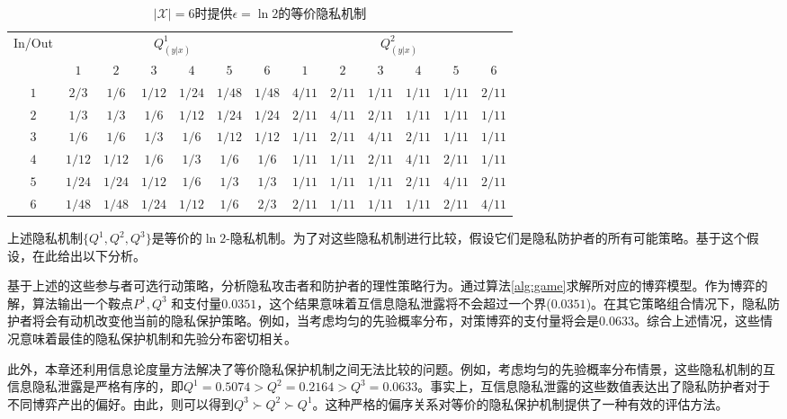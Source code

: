 \begin{table}[htbp]
\small
	\centering
	\caption{$|\mathcal{X}|=6$时提供$\epsilon=\ln2$的等价隐私机制}
	\label{tab:chapter07_6}
	\begin{tabular}{ccccccccccccc}
		\toprule
		\multirow{2}{*}{In/Out} & \multicolumn{6}{c}{$Q^1_{(y|x)}$} & \multicolumn{6}{c}{$Q^2_{(y|x)}$} \\
		\cmidrule(r){2-7} \cmidrule(r){8-13}
		&  $1$      &  $2$   &   $3$ &  $4$      &  $5$   &   $6$
		&  $1$      &  $2$   &   $3$ &  $4$      &  $5$   &   $6$\\
		\midrule
		$1$  &$2/3$  & $1/6$ &$1/12$   & $1/24$  & $1/48$   & $1/48$             &$4/11$  & $2/11$ &$1/11$ & $1/11$ &$1/11$  & $2/11$ \\
		$2$  &$1/3$   &$1/3$  & $1/6$ & $1/12$  & $1/24$  & $1/24$               &$2/11$  & $4/11$ &$2/11$ & $1/11$ &$1/11$  & $1/11$ \\
		$3$ &$1/6$ & $1/6$  & $1/3$  & $1/6$  & $1/12$ & $1/12$                  &$1/11$  & $2/11$ &$4/11$ & $2/11$ &$1/11$  & $1/11$ \\
		$4$ &$1/12$ & $1/12$  & $1/6$  & $1/3$  & $1/6$ & $1/6$                  &$1/11$  & $1/11$ &$2/11$ & $4/11$ &$2/11$  & $1/11$ \\
		$5$  &$1/24$ & $1/24$  & $1/12$  & $1/6$  & $1/3$ & $1/3$                &$1/11$  & $1/11$ &$1/11$ & $2/11$ &$4/11$  & $2/11$ \\
		$6$ &$1/48$ & $1/48$  & $1/24$  & $1/12$  & $1/6$ & $2/3$                &$2/11$  & $1/11$ &$1/11$ & $1/11$ &$2/11$  & $4/11$ \\
		\bottomrule
	\end{tabular}
\end{table}

上述隐私机制$\{Q^1,Q^2,Q^3\}$是等价的$\ln 2$-隐私机制。为了对这些隐私机制进行比较，假设它们是隐私防护者的所有可能策略。基于这个假设，在此给出以下分析。

基于上述的这些参与者可选行动策略，分析隐私攻击者和防护者的理性策略行为。通过算法\ref{alg:game}求解所对应的博弈模型。作为博弈的解，算法输出一个鞍点$P^1,Q^3$ 和支付量$0.0351$，这个结果意味着互信息隐私泄露将不会超过一个界($0.0351$)。在其它策略组合情况下，隐私防护者将会有动机改变他当前的隐私保护策略。例如，当考虑均匀的先验概率分布，对策博弈的支付量将会是$0.0633$。综合上述情况，这些情况意味着最佳的隐私保护机制和先验分布密切相关。

此外，本章还利用信息论度量方法解决了等价隐私保护机制之间无法比较的问题。例如，考虑均匀的先验概率分布情景，这些隐私机制的互信息隐私泄露是严格有序的，即$Q^1=0.5074 > Q^2=0.2164>Q^3=0.0633$。事实上，互信息隐私泄露的这些数值表达出了隐私防护者对于不同博弈产出的偏好。由此，则可以得到$Q^3 \succ Q^2 \succ Q^1$。这种严格的偏序关系对等价的隐私保护机制提供了一种有效的评估方法。


